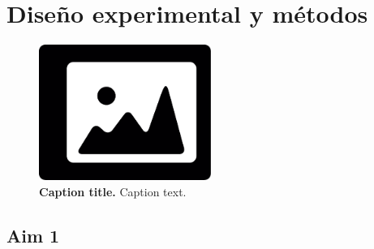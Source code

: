 \section{Diseño experimental y métodos}\label{sec:experimental} 

\lipsum*[2-3] 

\begin{figure}[H]
    \centering
    \includegraphics[width=0.5\textwidth]{figuras/image-single-col}
    \caption{{\bf{Caption title.}} Caption text.}\label{fig:sample}
\end{figure}


\subsection{Aim 1}\label{sec:aim1}

